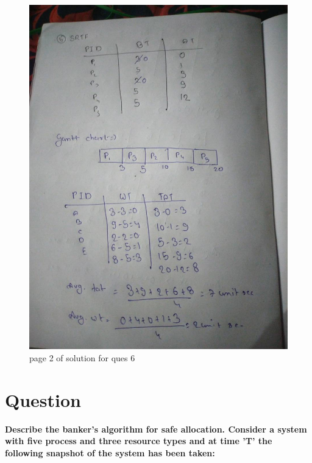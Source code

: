 \documentclass[11pt,a4paper,oneside]{article}
\begin{document}
\begin{figure}[hbt!]
	\centering
	\includegraphics[width=1.2\textwidth, angle=-90]{images/red_images/q6i2.jpg}
	\caption{page 2 of solution for ques 6}
\end{figure}


\clearpage

\section{Question}

\bgroup \bfseries
\noindent Describe the banker's algorithm for safe allocation. Consider a system with five process and three resource types and at time 'T' the following snapshot of the system has been taken:
\egroup{}
\end{document}
